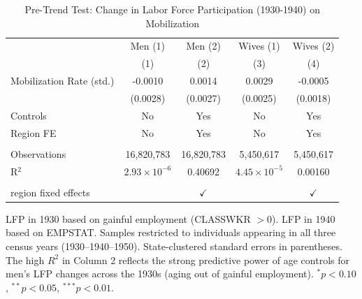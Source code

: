 
\begin{table}[htbp]
   \caption{\label{tab:pretrend} Pre-Trend Test: Change in Labor Force Participation (1930-1940) on Mobilization}
   \bigskip
   \centering
   \begin{tabular}{lcccc}
      \toprule
                               & Men (1)               & Men (2)       & Wives (1)             & Wives (2) \\   
                               & (1)                   & (2)           & (3)                   & (4)\\  
      \midrule 
      Mobilization Rate (std.) & -0.0010               & 0.0014        & 0.0029                & -0.0005\\   
                               & (0.0028)              & (0.0027)      & (0.0025)              & (0.0018)\\   
      Controls                 & No                    & Yes           & No                    & Yes\\  
      Region FE                & No                    & Yes           & No                    & Yes\\  
       \\
      Observations             & 16,820,783            & 16,820,783    & 5,450,617             & 5,450,617\\  
      R$^2$                    & $2.93\times 10^{-6}$  & 0.40692       & $4.45\times 10^{-5}$  & 0.00160\\  
       \\
      region fixed effects     &                       & $\checkmark$  &                       & $\checkmark$\\   
      \bottomrule
   \end{tabular}
   
   \par \raggedright 
   LFP in 1930 based on gainful employment (CLASSWKR $> 0$). LFP in 1940 based on EMPSTAT. Samples restricted to individuals appearing in all three census years (1930--1940--1950). State-clustered standard errors in parentheses. The high $R^2$ in Column 2 reflects the strong predictive power of age controls for men's LFP changes across the 1930s (aging out of gainful employment). $^*p < 0.10$, $^{**}p < 0.05$, $^{***}p < 0.01$.
\end{table}


